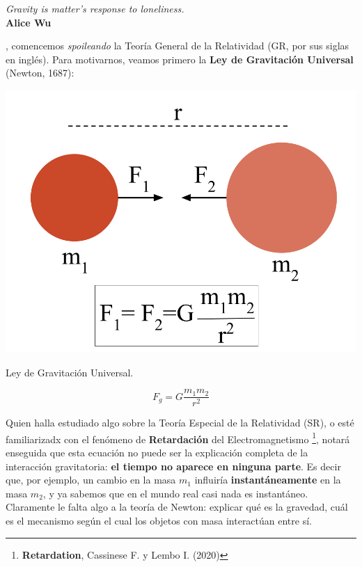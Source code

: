 \begin{flushright}
\textit{Gravity is matter's response to loneliness.}\\ \textbf{Alice Wu}
\end{flushright}
, comencemos \textit{spoileando} la Teoría General de la Relatividad (GR, por sus siglas en inglés). Para motivarnos, veamos primero la \textbf{Ley de Gravitación Universal} (Newton, 1687):

\begin{marginfigure}
\captionsetup{type=figure}
    \centering
    \includegraphics[width=1.3\textwidth]{Im/gravuniv.png}
    \caption{Ley de Gravitación Universal.}
    \label{fig:sen}
\end{marginfigure}

\begin{equation}
    F_{g}=G\frac{m_1 m_2}{r^2}
\end{equation}

Quien halla estudiado algo sobre la Teoría Especial de la Relatividad (SR), o esté familiarizadx con el fenómeno de \textbf{Retardación} del Electromagnetismo \footnote{\textbf{Retardation}, Cassinese F. y Lembo I. (2020)}, notará enseguida que esta ecuación no puede ser la explicación completa de la interacción gravitatoria: \textbf{el tiempo no aparece en ninguna parte}. Es decir que, por ejemplo, un cambio en la masa $m_1$ influiría \textbf{instantáneamente} en la masa $m_2$, y ya sabemos que en el mundo real casi nada es instantáneo. Claramente le falta algo a la teoría de Newton: explicar qué es la gravedad, cuál es el mecanismo según el cual los objetos con masa interactúan entre sí.

